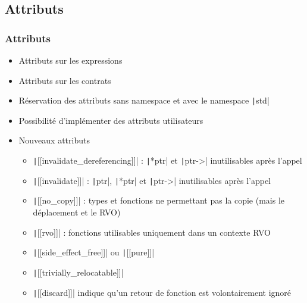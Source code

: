 \documentclass[C++.tex]{subfiles}
\begin{document}
\subsection*{Attributs}
\begin{frame}[fragile]
	\frametitle{Attributs}
	\begin{itemize}
		\item Attributs sur les expressions
		\item Attributs sur les contrats
		\item Réservation des attributs sans namespace et avec le namespace \texttt|std|
		\item Possibilité d'implémenter des attributs utilisateurs
		\item Nouveaux attributs
		\begin{itemize}
			\item \texttt|[[invalidate_dereferencing]]| : \texttt|*ptr| et \texttt|ptr->| inutilisables après l'appel


			\item \texttt|[[invalidate]]| : \texttt|ptr|, \texttt|*ptr| et \texttt|ptr->| inutilisables après l'appel


			\item \texttt|[[no_copy]]| : types et fonctions ne permettant pas la copie (mais le déplacement et le RVO)
			\item \texttt|[[rvo]]| : fonctions utilisables uniquement dans un contexte RVO
			\item \texttt|[[side_effect_free]]| ou \texttt|[[pure]]|
			\item \texttt|[[trivially_relocatable]]|
			\item \texttt|[[discard]]| indique qu'un retour de fonction est volontairement ignoré
		\end{itemize}
	\end{itemize}

\end{frame}
\end{document}
